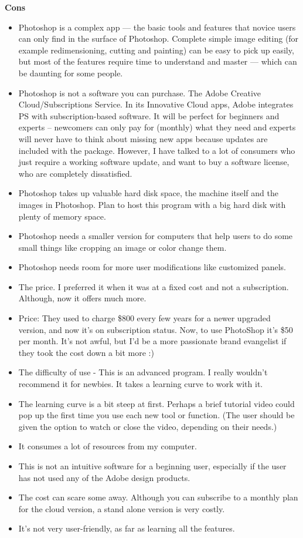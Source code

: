 \documentclass[a4paper,12pt]{article}
\begin{document}
\begin{enumerate}
  \textbf{Cons}
  \begin{itemize}
  \item Photoshop is a complex app — the basic tools and features that novice users can only find in the surface of Photoshop. Complete simple image editing (for example redimensioning, cutting and painting) can be easy to pick up easily, but most of the features require time to understand and master — which can be daunting for some people.
  \item Photoshop is not a software you can purchase. The Adobe Creative Cloud/Subscriptions Service. In its Innovative Cloud apps, Adobe integrates PS with subscription-based software. It will be perfect for beginners and experts – newcomers can only pay for (monthly) what they need and experts will never have to think about missing new apps because updates are included with the package. However, I have talked to a lot of consumers who just require a working software update, and want to buy a software license, who are completely dissatisfied.
  \item Photoshop takes up valuable hard disk space, the machine itself and the images in Photoshop. Plan to host this program with a big hard disk with plenty of memory space.
  \item Photoshop needs a smaller version for computers that help users to do some small things like cropping an image or color change them.
  \item Photoshop needs room for more user modifications like customized panels.
  \item The price. I preferred it when it was at a fixed cost and not a subscription. Although, now it offers much more.
  \item Price: They used to charge \$800 every few years for a newer upgraded version, and now it's on subscription status. Now, to use PhotoShop it's \$50 per month. It's not awful, but I'd be a more passionate brand evangelist if they took the cost down a bit more :)
  \item The difficulty of use - This is an advanced program. I really wouldn't recommend it for newbies. It takes a learning curve to work with it.
  \item The learning curve is a bit steep at first. Perhaps a brief tutorial video could pop up the first time you use each new tool or function. (The user should be given the option to watch or close the video, depending on their needs.)
  \item It consumes a lot of resources from my computer.
  \item This is not an intuitive software for a beginning user, especially if the user has not used any of the Adobe design products.
  \item The cost can scare some away. Although you can subscribe to a monthly plan for the cloud version, a stand alone version is very costly.
  \item It's not very user-friendly, as far as learning all the features.
  \end{itemize}
  

\end{enumerate}
\end{document}
